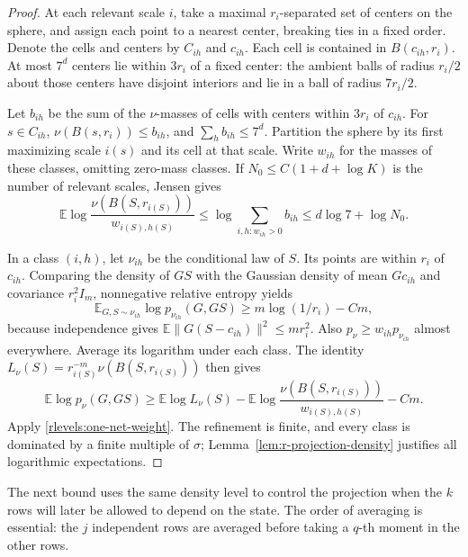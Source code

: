 \begin{proof}
At each relevant scale \(i\), take a maximal \(r_i\)-separated set
of centers on the sphere, and assign each point to a nearest center,
breaking ties in a fixed order.  Denote the cells and centers by
\(C_{ih}\) and \(c_{ih}\).  Each cell is contained in
\(B(c_{ih},r_i)\).  At most \(7^d\) centers lie within \(3r_i\)
of a fixed center: the ambient balls of radius \(r_i/2\) about
those centers have disjoint interiors and lie in a ball of radius
\(7r_i/2\).

Let \(b_{ih}\) be the sum of the \(\nu\)-masses of cells with centers
within \(3r_i\) of \(c_{ih}\).  For \(s\in C_{ih}\),
\(\nu(B(s,r_i))\le b_{ih}\), and
\(\sum_h b_{ih}\le7^d\).  Partition the sphere by its first
maximizing scale \(i(s)\) and its cell at that scale.  Write \(w_{ih}\)
for the masses of these classes, omitting zero-mass classes.  If
\(N_0\le C(1+d+\log K)\) is the number of relevant scales, Jensen
gives
\begin{equation}\label{rlevels:one-net-weight}
 \mathbb E\log\frac{\nu(B(S,r_{i(S)}))}
                       {w_{i(S),h(S)}}
 \le \log\sum_{i,h:w_{ih}>0}b_{ih}
 \le d\log7+\log N_0.
\end{equation}

In a class \((i,h)\), let \(\nu_{ih}\) be the conditional law of
\(S\).  Its points are within \(r_i\) of \(c_{ih}\).  Comparing
the density of \(GS\) with the Gaussian density of mean \(Gc_{ih}\)
and covariance \(r_i^2I_m\), nonnegative relative entropy yields
\[
 \mathbb E_{G,S\sim\nu_{ih}}\log p_{\nu_{ih}}(G,GS)
 \ge m\log(1/r_i)-Cm,
\]
because independence gives
\(\mathbb E\|G(S-c_{ih})\|^2\le mr_i^2\).
Also \(p_\nu\ge w_{ih}p_{\nu_{ih}}\) almost everywhere.
Average its logarithm under each class.  The identity
\(L_\nu(S)=r_{i(S)}^{-m}\nu(B(S,r_{i(S)}))\) then gives
\[
 \mathbb E\log p_\nu(G,GS)
 \ge \mathbb E\log L_\nu(S)
 -\mathbb E\log\frac{\nu(B(S,r_{i(S)}))}
                       {w_{i(S),h(S)}}-Cm.
\]
Apply \eqref{rlevels:one-net-weight}.  The refinement is finite,
and every class is dominated by a finite multiple of \(\sigma\);
Lemma~\ref{lem:r-projection-density} justifies all logarithmic
expectations.
\end{proof}

The next bound uses the same density level to control the projection
when the \(k\) rows will later be allowed to depend on the state.
The order of averaging is essential: the \(j\) independent rows are
averaged before taking a \(q\)-th moment in the other rows.

